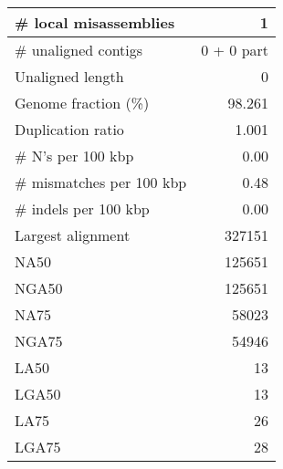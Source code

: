 \documentclass[12pt,a4paper]{article}
\begin{document}
\begin{table}[ht]
\begin{center}
\begin{tabular}{|l*{1}{|r}|}
\# local misassemblies & 1 \\ \hline
\# unaligned contigs & 0 + 0 part \\ \hline
Unaligned length & 0 \\ \hline
Genome fraction (\%) & 98.261 \\ \hline
Duplication ratio & 1.001 \\ \hline
\# N's per 100 kbp & 0.00 \\ \hline
\# mismatches per 100 kbp & 0.48 \\ \hline
\# indels per 100 kbp & 0.00 \\ \hline
Largest alignment & 327151 \\ \hline
NA50 & 125651 \\ \hline
NGA50 & 125651 \\ \hline
NA75 & 58023 \\ \hline
NGA75 & 54946 \\ \hline
LA50 & 13 \\ \hline
LGA50 & 13 \\ \hline
LA75 & 26 \\ \hline
LGA75 & 28 \\ \hline
\end{tabular}
\end{center}
\end{table}
\end{document}
